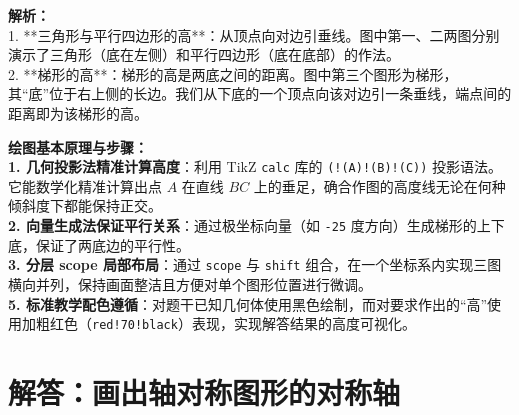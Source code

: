 \begin{center}
\end{center}

\vspace{0.8cm}

{\small\color{gray}
\textbf{解析：}\\
1. **三角形与平行四边形的高**：从顶点向对边引垂线。图中第一、二两图分别演示了三角形（底在左侧）和平行四边形（底在底部）的作法。\\
2. **梯形的高**：梯形的高是两底之间的距离。图中第三个图形为梯形，其“底”位于右上侧的长边。我们从下底的一个顶点向该对边引一条垂线，端点间的距离即为该梯形的高。
}

\vspace{0.6cm}

{\small\color{blue!70!black}
\textbf{绘图基本原理与步骤：}\\
\textbf{1. 几何投影法精准计算高度}：利用 TikZ \texttt{calc} 库的 \texttt{(!(A)!(B)!(C))} 投影语法。它能数学化精准计算出点 $A$ 在直线 $BC$ 上的垂足，确合作图的高度线无论在何种倾斜度下都能保持正交。\\
\textbf{2. 向量生成法保证平行关系}：通过极坐标向量（如 \texttt{-25} 度方向）生成梯形的上下底，保证了两底边的平行性。\\
\textbf{3. 分层 scope 局部布局}：通过 \texttt{scope} 与 \texttt{shift} 组合，在一个坐标系内实现三图横向并列，保持画面整洁且方便对单个图形位置进行微调。\\
\textbf{5. 标准教学配色遵循}：对题干已知几何体使用黑色绘制，而对要求作出的“高”使用加粗红色（\texttt{red!70!black}）表现，实现解答结果的高度可视化。
}

\newpage


\section{解答：画出轴对称图形的对称轴}

